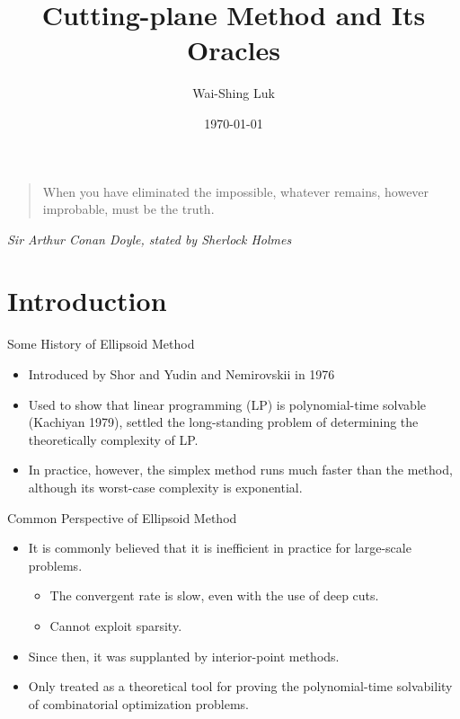 \documentclass[10pt,ignorenonframetext,serif,onlymath]{beamer}
\title{Cutting-plane Method and Its Oracles}
\author{Wai-Shing Luk}
\institute{Fudan University}
\date{\today}
\begin{document}
\frame{\titlepage}

\begin{frame}
\tableofcontents[hideallsubsections]
\end{frame}
\begin{frame}

\begin{quote}
When you have eliminated the impossible, whatever remains, however
improbable, must be the truth.
\end{quote}

\emph{Sir Arthur Conan Doyle, stated by Sherlock Holmes}

\end{frame}

\hypertarget{sec:introduction}{%
\section{Introduction}\label{sec:introduction}}

\begin{frame}{Some History of Ellipsoid Method}
\protect\hypertarget{sec:some-history-of-ellipsoid-method}{}

\begin{itemize}
\item
  Introduced by Shor and Yudin and Nemirovskii in 1976
\item
  Used to show that linear programming (LP) is polynomial-time solvable
  (Kachiyan 1979), settled the long-standing problem of determining the
  theoretically complexity of LP.
\item
  In practice, however, the simplex method runs much faster than the
  method, although its worst-case complexity is exponential.
\end{itemize}

\end{frame}

\begin{frame}{Common Perspective of Ellipsoid Method}
\protect\hypertarget{sec:common-perspective-of-ellipsoid-method}{}

\begin{itemize}
\item
  It is commonly believed that it is inefficient in practice for
  large-scale problems.

  \begin{itemize}
  \item
    The convergent rate is slow, even with the use of deep cuts.
  \item
    Cannot exploit sparsity.
  \end{itemize}
\item
  Since then, it was supplanted by interior-point methods.
\item
  Only treated as a theoretical tool for proving the polynomial-time
  solvability of combinatorial optimization problems.
\end{itemize}

\end{frame}
\end{document}
